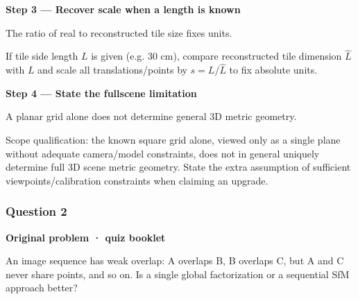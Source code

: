 \documentclass[letterpaper,11pt,english,openany,oneside]{jupyterBook}
\begin{document}
\par

\par\medskip{}
{\color{QuizStepRed}\bfseries Step 3 — Recover scale when a length is known}\par\smallskip

\sphinxAtStartPar
{} The ratio of real to reconstructed tile size fixes units.

\sphinxAtStartPar
If tile side length {\color{QuizMathBlue} \(L\)} is given (e.g. 30 cm), compare reconstructed tile dimension {\color{QuizMathBlue} \(\hat L\)} with {\color{QuizMathBlue} \(L\)} and scale all translations/points by {\color{QuizMathBlue} \(s=L/\hat L\)} to fix absolute units.

\par

\par\medskip{}
{\color{QuizStepRed}\bfseries Step 4 — State the full\sphinxhyphen{}scene limitation}\par\smallskip

\sphinxAtStartPar
{} A planar grid alone does not determine general 3D metric geometry.

\sphinxAtStartPar
Scope qualification: the known square grid alone, viewed only as a single plane without adequate camera/model constraints, does not in general uniquely determine full 3D scene metric geometry. State the extra assumption of sufficient viewpoints/calibration constraints when claiming an  upgrade.

\par


\subsubsection{Question 2}
\label{\detokenize{lectures/lecture06/quiz-workbook:question-2}}\label{\detokenize{lectures/lecture06/quiz-workbook:quiz-12-q3}}
\par\medskip\textbf{Original problem · quiz booklet}\par\smallskip

\sphinxAtStartPar
An image sequence has weak overlap: A overlaps B, B overlaps C, but A and C never share points, and so on. Is a single global factorization or a sequential SfM approach better?

\par\medskip
\end{document}
